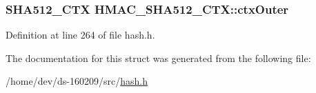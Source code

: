\hypertarget{struct_h_m_a_c___s_h_a512___c_t_x_aaed38b9a2310e97f4d516b40d7ac2f9f}{}
\subsubsection[{ctx\+Outer}]{\setlength{\rightskip}{0pt plus 5cm}S\+H\+A512\+\_\+\+C\+T\+X H\+M\+A\+C\+\_\+\+S\+H\+A512\+\_\+\+C\+T\+X\+::ctx\+Outer}\label{struct_h_m_a_c___s_h_a512___c_t_x_aaed38b9a2310e97f4d516b40d7ac2f9f}


Definition at line 264 of file hash.\+h.



The documentation for this struct was generated from the following file\+:\begin{DoxyCompactItemize}
\item 
/home/dev/ds-\/160209/src/\hyperlink{hash_8h}{hash.\+h}\end{DoxyCompactItemize}
